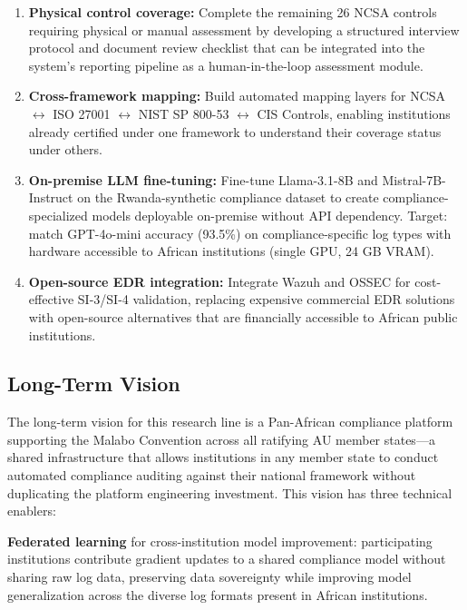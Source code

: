 \documentclass[12pt,oneside]{report}
\begin{document}
\begin{enumerate}
  \item \textbf{Physical control coverage:} Complete the remaining 26 NCSA controls requiring physical or manual assessment by developing a structured interview protocol and document review checklist that can be integrated into the system's reporting pipeline as a human-in-the-loop assessment module.

  \item \textbf{Cross-framework mapping:} Build automated mapping layers for NCSA $\leftrightarrow$ ISO 27001 $\leftrightarrow$ NIST SP 800-53 $\leftrightarrow$ CIS Controls, enabling institutions already certified under one framework to understand their coverage status under others.

  \item \textbf{On-premise LLM fine-tuning:} Fine-tune Llama-3.1-8B and Mistral-7B-Instruct on the Rwanda-synthetic compliance dataset to create compliance-specialized models deployable on-premise without API dependency. Target: match GPT-4o-mini accuracy (93.5\%) on compliance-specific log types with hardware accessible to African institutions (single GPU, 24 GB VRAM).

  \item \textbf{Open-source EDR integration:} Integrate Wazuh and OSSEC for cost-effective SI-3/SI-4 validation, replacing expensive commercial EDR solutions with open-source alternatives that are financially accessible to African public institutions.
\end{enumerate}

\subsection{Long-Term Vision}

The long-term vision for this research line is a Pan-African compliance platform supporting the Malabo Convention across all ratifying AU member states—a shared infrastructure that allows institutions in any member state to conduct automated compliance auditing against their national framework without duplicating the platform engineering investment. This vision has three technical enablers:

\textbf{Federated learning} for cross-institution model improvement: participating institutions contribute gradient updates to a shared compliance model without sharing raw log data, preserving data sovereignty while improving model generalization across the diverse log formats present in African institutions.
\end{document}
